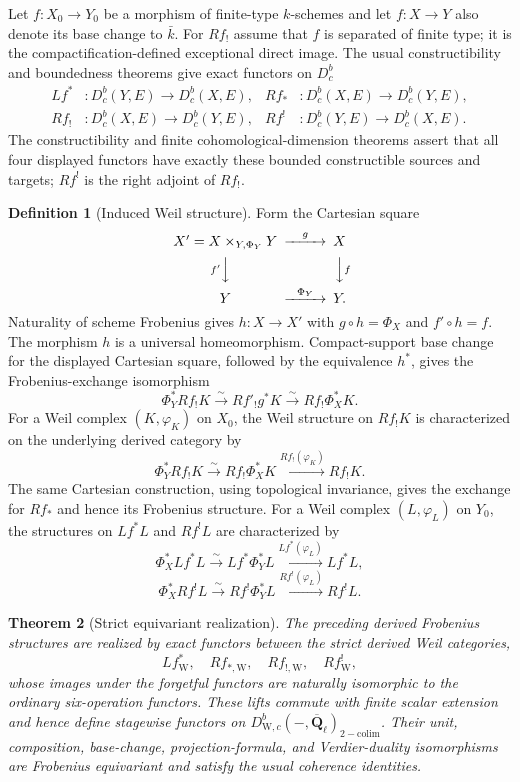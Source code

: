 \documentclass[10pt]{article}
\newtheorem{theorem}{Theorem}[section]
\theoremstyle{definition}
\newtheorem{definition}[theorem]{Definition}
\newcommand{\Qlb}{\overline{\mathbf Q}_\ell}
\newcommand{\Dbc}{D^b_c}
\newcommand{\WeilD}{D^b_{\mathrm W,c}}
\begin{document}
Let \(f:X_0\to Y_0\) be a morphism of finite-type \(k\)-schemes and let
\(f:X\to Y\) also denote its base change to \(\bar k\).  For \(Rf_!\) assume
that \(f\) is separated of finite type; it is the compactification-defined
exceptional direct image.  The usual constructibility and boundedness
theorems give exact functors on \(\Dbc\)
\[
\begin{aligned}
 Lf^*&:\Dbc(Y,E)\longrightarrow\Dbc(X,E),&
 Rf_*&:\Dbc(X,E)\longrightarrow\Dbc(Y,E),\\
 Rf_!&:\Dbc(X,E)\longrightarrow\Dbc(Y,E),&
 Rf^!&:\Dbc(Y,E)\longrightarrow\Dbc(X,E).
\end{aligned}
\]
The constructibility and finite cohomological-dimension theorems assert that
all four displayed functors have exactly these bounded constructible sources
and targets; \(Rf^!\) is the right adjoint of \(Rf_!\).

\begin{definition}[Induced Weil structure]
Form the Cartesian square
\[
\begin{CD}
 X'=X\times_{Y,\Phi_Y}Y @>{g}>> X\\
 @V{f'}VV @VV{f}V\\
 Y @>{\Phi_Y}>> Y .
\end{CD}
\]
Naturality of scheme Frobenius gives
\(h:X\to X'\) with \(g\circ h=\Phi_X\) and \(f'\circ h=f\).
The morphism \(h\) is a universal homeomorphism.  Compact-support base
change for the displayed Cartesian square, followed by the equivalence
\(h^*\), gives the Frobenius-exchange isomorphism
\[
 \Phi_Y^*Rf_!K\xrightarrow{\sim}Rf'_!g^*K
       \xrightarrow{\sim}Rf_!\Phi_X^*K.
\]
For a Weil complex \((K,\varphi_K)\) on \(X_0\), the Weil structure on
\(Rf_!K\) is characterized on the underlying derived category by
\[
 \Phi_Y^*Rf_!K\xrightarrow{\sim}Rf_!\Phi_X^*K
       \xrightarrow{Rf_!(\varphi_K)}Rf_!K.
\]
The same Cartesian construction, using topological invariance, gives the
exchange for \(Rf_*\) and hence its Frobenius structure.  For a Weil complex
\((L,\varphi_L)\) on \(Y_0\), the structures on \(Lf^*L\) and \(Rf^!L\)
are characterized by
\[
 \Phi_X^*Lf^*L\xrightarrow{\sim}Lf^*\Phi_Y^*L
       \xrightarrow{Lf^*(\varphi_L)}Lf^*L,
\]
\[
 \Phi_X^*Rf^!L\xrightarrow{\sim}Rf^!\Phi_Y^*L
       \xrightarrow{Rf^!(\varphi_L)}Rf^!L.
\]
\end{definition}

\begin{theorem}[Strict equivariant realization]
The preceding derived Frobenius structures are realized by exact functors
between the strict derived Weil categories,
\[
 Lf^*_{\mathrm W},\quad Rf_{*,\mathrm W},\quad
 Rf_{!,\mathrm W},\quad Rf^!_{\mathrm W},
\]
whose images under the forgetful functors are naturally isomorphic to the
ordinary six-operation functors.  These lifts commute with finite scalar
extension and hence define stagewise functors on
\(\WeilD(-,\Qlb)_{\mathrm{2-colim}}\).  Their unit, composition, base-change,
projection-formula, and Verdier-duality isomorphisms are Frobenius
equivariant and satisfy the usual coherence identities.
\end{theorem}
\end{document}

